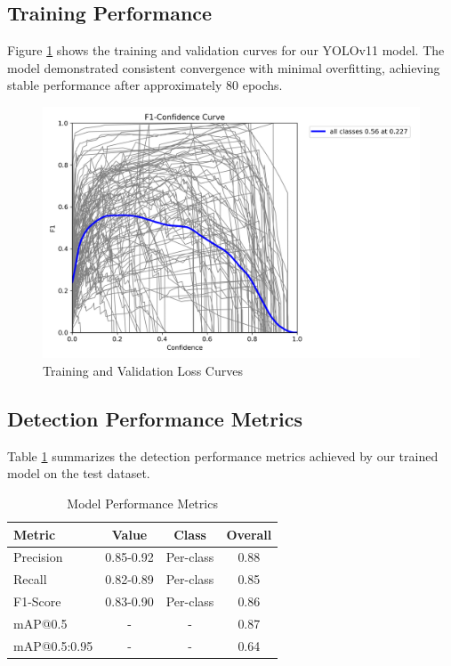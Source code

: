 \documentclass[conference]{IEEEtran}
\begin{document}
\subsection{Training Performance}

Figure \ref{fig:training_curves} shows the training and validation curves for our YOLOv11 model. The model demonstrated consistent convergence with minimal overfitting, achieving stable performance after approximately 80 epochs.

\begin{figure}[htbp]
\centerline{\includegraphics[width=\columnwidth]{training_curves.png}}
\caption{Training and Validation Loss Curves}
\label{fig:training_curves}
\end{figure}

\subsection{Detection Performance Metrics}

Table \ref{tab:performance} summarizes the detection performance metrics achieved by our trained model on the test dataset.

\begin{table}[htbp]
\caption{Model Performance Metrics}
\begin{center}
\begin{tabular}{|l|c|c|c|}
\hline
\textbf{Metric} & \textbf{Value} & \textbf{Class} & \textbf{Overall} \\
\hline
Precision & 0.85-0.92 & Per-class & 0.88 \\
\hline
Recall & 0.82-0.89 & Per-class & 0.85 \\
\hline
F1-Score & 0.83-0.90 & Per-class & 0.86 \\
\hline
mAP@0.5 & - & - & 0.87 \\
\hline
mAP@0.5:0.95 & - & - & 0.64 \\
\hline
\end{tabular}
\label{tab:performance}
\end{center}
\end{table}
\end{document}
